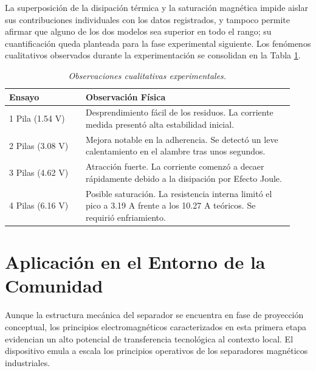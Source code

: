 La superposición de la disipación térmica y la saturación magnética impide aislar sus contribuciones individuales con los datos registrados, y tampoco permite afirmar que alguno de los dos modelos sea superior en todo el rango; su cuantificación queda planteada para la fase experimental siguiente. Los fenómenos cualitativos observados durante la experimentación se consolidan en la Tabla \ref{tab:observaciones}.

\begin{table}[H]
  \centering
  \caption{\textit{Observaciones cualitativas experimentales.}}
  \label{tab:observaciones}
  \begin{tabular}{@{}p{0.25\linewidth} p{0.68\linewidth}@{}}
    \hline
    \textbf{Ensayo} & \textbf{Observación Física} \\
    \hline
    1 Pila \newline(1.54 V) & Desprendimiento fácil de los residuos. La corriente medida presentó alta estabilidad inicial.\\
    2 Pilas \newline(3.08 V) & Mejora notable en la adherencia. Se detectó un leve calentamiento en el alambre tras unos segundos.\\
    3 Pilas \newline(4.62 V) & Atracción fuerte. La corriente comenzó a decaer rápidamente debido a la disipación por Efecto Joule.\\
    4 Pilas \newline(6.16 V) & Posible saturación. La resistencia interna limitó el pico a 3.19 A frente a los 10.27 A teóricos. Se requirió enfriamiento.\\
    \hline
  \end{tabular}
\end{table}

\section{Aplicación en el Entorno de la Comunidad}

Aunque la estructura mecánica del separador se encuentra en fase de proyección conceptual, los principios electromagnéticos caracterizados en esta primera etapa evidencian un alto potencial de transferencia tecnológica al contexto local. El dispositivo emula a escala los principios operativos de los separadores magnéticos industriales.

